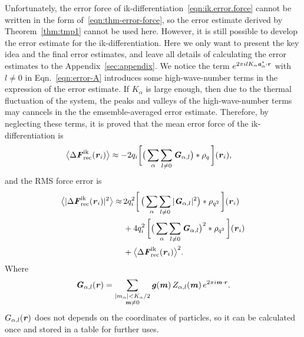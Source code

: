 \documentclass[aps,pre,preprint]{revtex4}
\renewcommand{\v}[1]{\textbf{\textit{#1}}}
\begin{document}
Unfortunately, the
error force of ik-differentiation~\eqref{eqn:ik.error.force} cannot be written
in the form of~\eqref{eqn:thm-error-force}, so the error estimate derived by
Theorem~\ref{thm:tmp1} cannot be used here. However, it is still
possible to develop the error estimate for the ik-differentiation.
Here we only want to present the key idea and the final  error
estimates, and leave all details of calculating the error estimates
to the Appendix~\ref{sec:appendix}.  We notice the
term $e^{2\pi i l K_\alpha\v a^\ast_\alpha\cdot\v r}$ with $l\neq 0$
in Eqn.~\eqref{eqn:error-A} introduces some high-wave-number terms in
the expression of the error estimate.  If $K_\alpha$ is large enough,
then due to the thermal fluctuation of the system, the peaks and
valleys of the high-wave-number terms may canncels in the the
emsemble-averaged error estimate.
Therefore, by neglecting these terms, it is proved that the mean error
force of the ik-differentiation is
\begin{align}\label{eqn:ik.meanf}
  \big\langle
  \Delta\v F_{\textrm{rec}}^{\textrm{ik}}(\v r_i)
  \big\rangle
  & \approx
  - 2 q_i
  \bigg[
  \big(
  \sum_{\alpha}\sum_{l\neq 0}\v G_{\alpha,l}
  \big)
  \ast\rho_q\,
  \bigg] (\v r_i),
\end{align}
and the RMS force error is 
\begin{align}\nonumber
  \big\langle
  \vert\Delta\v F_{\textrm{rec}}^{\textrm{ik}}(\v r_i)\vert^2
  \big\rangle
  \approx&\, 
  2q_i^2
  \bigg[\,
  \big(
  \sum_{\alpha} \sum_{l\neq 0}
  \vert \v G_{\alpha,l}\vert^2
  \big)
  \ast \rho_{q^2}
  \,\bigg] (\v r_i)\\\nonumber
  &\,+
  4q_i^2\,
  \bigg[
  \big(
  \sum_{\alpha} \sum_{l\neq 0}  
  \v G_{\alpha,l}
  \big)^2
  \ast \rho_{q^2}\,
  \bigg] (\v r_i) \\\label{eqn:ik.error}
  &\,+
  \big\langle
  \Delta\v F_{\textrm{rec}}^{\textrm{ik}}(\v r_i)
  \big\rangle^2.
\end{align}
Where
\begin{align}
  \v G_{\alpha,l}(\v r) =
  \sum_{
    \begin{subarray}{c}
      \vert m_{\alpha}\vert < K_\alpha/2\\
      \v m\neq 0
    \end{subarray}}
  \v g(\v m)\,
  Z_{\alpha,l}(\v m)\,
  e^{2\pi i\v m\cdot\v r}.
\end{align}
$G_{\alpha,l}(\v r)$ does not depends on the coordinates of particles,
so it can be calculated once and stored in a table for further uses.
\end{document}
